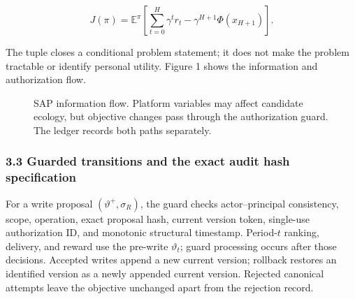 \documentclass[
  11pt]{article}
\begin{document}
\[J(\pi)=\mathbb E^\pi\!\left[\sum_{t=0}^{H}\gamma^t r_t-\gamma^{H+1}\Phi(x_{H+1})\right].\tag{2}\]

The tuple closes a conditional problem statement; it does not make the
problem tractable or identify personal utility. Figure 1 shows the
information and authorization flow.

\begin{figure}[htbp]
\centering
{}
\caption{SAP information flow. Platform variables may affect candidate ecology, but objective changes pass through the authorization guard. The ledger records both paths separately.}
\label{fig:sap-flow}
\end{figure}

\subsubsection{3.3 Guarded transitions and the exact audit hash
specification}\label{guarded-transitions-and-the-exact-audit-hash-specification}

For a write proposal \((\vartheta^+,\sigma_R)\), the guard checks
actor--principal consistency, scope, operation, exact proposal hash,
current version token, single-use authorization ID, and monotonic
structural timestamp. Period-\(t\) ranking, delivery, and reward use the
pre-write \(\vartheta_t\); guard processing occurs after those
decisions. Accepted writes append a new current version; rollback
restores an identified version as a newly appended current version.
Rejected canonical attempts leave the objective unchanged apart from the
rejection record.
\end{document}
